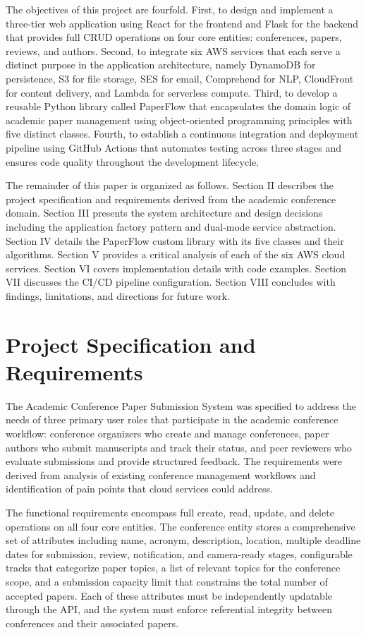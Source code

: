 \documentclass[conference]{IEEEtran}
\begin{document}
The objectives of this project are fourfold. First, to design and implement a three-tier web application using React for the frontend and Flask for the backend that provides full CRUD operations on four core entities: conferences, papers, reviews, and authors. Second, to integrate six AWS services that each serve a distinct purpose in the application architecture, namely DynamoDB for persistence, S3 for file storage, SES for email, Comprehend for NLP, CloudFront for content delivery, and Lambda for serverless compute. Third, to develop a reusable Python library called PaperFlow that encapsulates the domain logic of academic paper management using object-oriented programming principles with five distinct classes. Fourth, to establish a continuous integration and deployment pipeline using GitHub Actions that automates testing across three stages and ensures code quality throughout the development lifecycle.

The remainder of this paper is organized as follows. Section II describes the project specification and requirements derived from the academic conference domain. Section III presents the system architecture and design decisions including the application factory pattern and dual-mode service abstraction. Section IV details the PaperFlow custom library with its five classes and their algorithms. Section V provides a critical analysis of each of the six AWS cloud services. Section VI covers implementation details with code examples. Section VII discusses the CI/CD pipeline configuration. Section VIII concludes with findings, limitations, and directions for future work.

\section{Project Specification and Requirements}

The Academic Conference Paper Submission System was specified to address the needs of three primary user roles that participate in the academic conference workflow: conference organizers who create and manage conferences, paper authors who submit manuscripts and track their status, and peer reviewers who evaluate submissions and provide structured feedback. The requirements were derived from analysis of existing conference management workflows and identification of pain points that cloud services could address.

The functional requirements encompass full create, read, update, and delete operations on all four core entities. The conference entity stores a comprehensive set of attributes including name, acronym, description, location, multiple deadline dates for submission, review, notification, and camera-ready stages, configurable tracks that categorize paper topics, a list of relevant topics for the conference scope, and a submission capacity limit that constrains the total number of accepted papers. Each of these attributes must be independently updatable through the API, and the system must enforce referential integrity between conferences and their associated papers.
\end{document}
